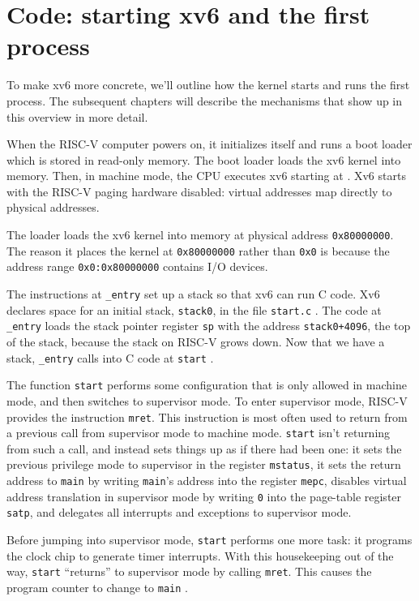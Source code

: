 \section{Code: starting xv6 and the first process}
To make xv6 more concrete, we'll outline how the kernel starts and
runs the first process. The subsequent chapters will describe the
mechanisms that show up in this overview in more detail.

When the RISC-V computer powers on, it initializes
itself and runs a boot loader which is stored in read-only
memory.  The boot loader loads the xv6 kernel into memory.  Then, in
machine mode, the CPU executes xv6 starting at
.
Xv6 starts with the RISC-V paging hardware disabled:
virtual addresses map directly to physical addresses.

The loader loads the xv6 kernel into memory at physical address
\texttt{0x80000000}.
The reason it places the kernel at
\texttt{0x80000000}
rather than
\texttt{0x0}
is because the address range
\texttt{0x0:0x80000000}
contains I/O devices.

The instructions at
\lstinline{_entry}
set up a stack so that xv6 can run C code.
Xv6 declares space for an initial stack,
\lstinline{stack0},
in the file
\lstinline{start.c}
.
The code at
\lstinline{_entry}
loads the stack pointer register
\texttt{sp}
with the address
\lstinline{stack0+4096},
the top of the stack, because the stack
on RISC-V grows down.
Now that we have a stack,
\lstinline{_entry}
calls into C code at
\lstinline{start}
.

The function
\lstinline{start}
performs some configuration that is only allowed in
machine mode, and then switches to supervisor mode.
To enter supervisor mode, RISC-V
provides the instruction
\lstinline{mret}.
This instruction is most often used to return from
a previous call from supervisor mode to machine mode.
\lstinline{start} isn't returning from such a call, and
instead sets things up as if there had been one:
it sets the previous privilege mode to
supervisor in the register
\lstinline{mstatus},
it sets the return address to
\lstinline{main}
by writing
\lstinline{main}'s
address into
the register
\lstinline{mepc},
disables virtual address translation in supervisor mode
by writing
\lstinline{0}
into the page-table register
\lstinline{satp},
and delegates all interrupts and exceptions
to supervisor mode.

Before jumping into supervisor mode,
\lstinline{start}
performs one more task: it programs the clock
chip to generate timer interrupts.
With this housekeeping out of the way,
\lstinline{start}
``returns'' to supervisor
mode by calling
\lstinline{mret}.
This causes the program counter to change
to
\lstinline{main}
.

